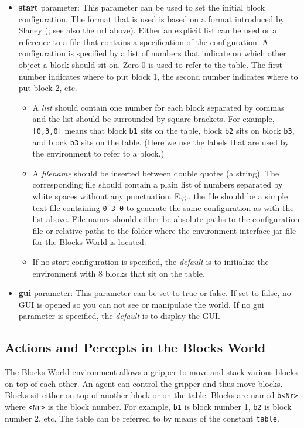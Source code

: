\documentclass{article}
\begin{document}
\begin{itemize}
	\item \textbf{start} parameter: This parameter can be used to set the initial block configuration. The format that is used is based on a format introduced by Slaney (\cite{Sla01}; see also the url above). Either an explicit list can be used or a reference to a file that contains a specification of the configuration. A configuration is specified by a list of numbers that indicate on which other object a block should sit on. Zero $0$ is used to refer to the table. The first number indicates where to put block 1, the second number indicates where to put block 2, etc.
	\begin{itemize}
		\item A \textit{list} should contain one number for each block separated by commas and the list should be surrounded by square brackets. For example,  \texttt{[0,3,0]} means that block \texttt{b1} sits on the table, block \texttt{b2} sits on block \texttt{b3}, and block \texttt{b3} sits on the table. (Here we use the labels that are used by the environment to refer to a block.)
		\item A \textit{filename} should be inserted between double quotes (a string). The corresponding file should contain a plain list of numbers separated by white spaces without any punctuation. E.g., the file should be a simple text file containing \texttt{0 3 0} to generate the same configuration as with the list above. File names should either be absolute paths to the configuration file or relative paths to the folder where the environment interface jar file for the Blocks World is located.
		\item If no start configuration is specified, the \textit{default} is to initialize the environment with 8 blocks that sit on the table.
	\end{itemize}
	\item \textbf{gui} parameter: This parameter can be set to true or false. If set to false, no GUI is opened so you can not see or manipulate the world. If no gui parameter is specified, the \textit{default} is to display the GUI.
\end{itemize}

%
%
%
\subsection{Actions and Percepts in the Blocks World}
%
The Blocks World environment allows a gripper to move and stack various blocks on top of each other. An agent can control the gripper and thus move blocks. Blocks sit either on top of another block or on the table. Blocks are named \texttt{b<Nr>} where \texttt{<Nr>} is the block number. For example, \texttt{b1} is block number 1, \texttt{b2} is block number 2, etc. The table can be referred to by means of the constant \texttt{table}.
\end{document}
